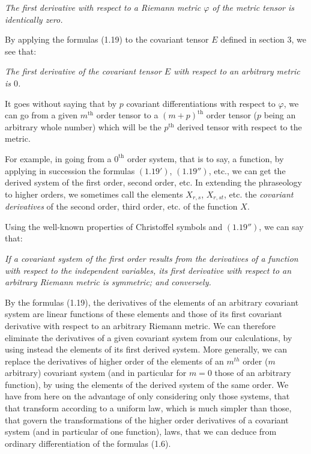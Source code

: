 \documentclass{book}
\begin{document}
\emph{The first derivative with respect to a Riemann metric $\varphi$ of the metric tensor is identically zero.}

By applying the formulas (1.19) to the covariant tensor $E$ defined in section 3, we see that:

\emph{The first derivative of the covariant tensor $E$ with respect to an arbitrary metric is $0$.}

It goes without saying that by $p$ covariant differentiations with respect to $\varphi$, we can go from a given $m^{\text{th}}$ order tensor to a $(m+p)^{\text{th}}$ order tensor ($p$ being an arbitrary whole number) which will be the $p^{\text{th}}$ derived tensor with respect to the metric.

For example, in going from a $0^{\text{th}}$ order system, that is to say, a function, by applying in succession the formulas $(1.19')$, $(1.19'')$, etc., we can get the derived system of the first order, second order, etc. In extending the phraseology to higher orders, we sometimes call the elements $X_{r,s}$, $X_{r,st}$, etc. the \emph{covariant derivatives} of the second order, third order, etc. of the function $X$.

Using the well-known properties of Christoffel symbols and $(1.19'')$, we can say that:

\emph{If a covariant system of the first order results from the derivatives of a function with respect to the independent variables, its first derivative with respect to an arbitrary Riemann metric is symmetric; and conversely.}

By the formulas (1.19), the derivatives of the elements of an arbitrary covariant system are linear functions of these elements and those of its first covariant derivative with respect to an arbitrary Riemann metric. We can therefore eliminate the derivatives of a given covariant system from our calculations, by using instead the elements of its first derived system. More generally, we can replace the derivatives of higher order of the elements of an $m^{th}$ order ($m$ arbitrary) covariant system (and in particular for $m=0$ those of an arbitrary function), by using the elements of the derived system of the same order. We have from here on the advantage of only considering only those systems, that that transform according to a uniform law, which is much simpler than those, that govern the transformations of the higher order derivatives of a covariant system (and in particular of one function), laws, that we can deduce from ordinary differentiation of the formulas (1.6).
\end{document}
